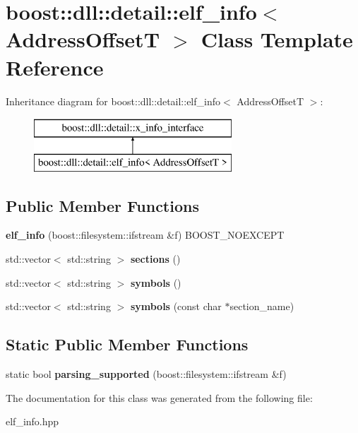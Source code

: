 \hypertarget{a01408}{}\section{boost\+:\+:dll\+:\+:detail\+:\+:elf\+\_\+info$<$ Address\+OffsetT $>$ Class Template Reference}
\label{a01408}
Inheritance diagram for boost\+:\+:dll\+:\+:detail\+:\+:elf\+\_\+info$<$ Address\+OffsetT $>$\+:\begin{figure}[H]
\begin{center}
\leavevmode
\includegraphics[height=2.000000cm]{a01408}
\end{center}
\end{figure}
\subsection*{Public Member Functions}
\begin{DoxyCompactItemize}
\item 
\mbox{\label{a01408_a86ac2d6ccd8f1690d9fa285a20a9357e}} 
{\bfseries elf\+\_\+info} (boost\+::filesystem\+::ifstream \&f) B\+O\+O\+S\+T\+\_\+\+N\+O\+E\+X\+C\+E\+PT
\item 
\mbox{\label{a01408_a14b62434f2be710f2a0a8da8fde24bca}} 
std\+::vector$<$ std\+::string $>$ {\bfseries sections} ()
\item 
\mbox{\label{a01408_a131b0f293d358d4d75ac6f63ec365285}} 
std\+::vector$<$ std\+::string $>$ {\bfseries symbols} ()
\item 
\mbox{\label{a01408_a07e28e88baa3914a205693b8921d2b87}} 
std\+::vector$<$ std\+::string $>$ {\bfseries symbols} (const char $\ast$section\+\_\+name)
\end{DoxyCompactItemize}
\subsection*{Static Public Member Functions}
\begin{DoxyCompactItemize}
\item 
\mbox{\label{a01408_a7f38916fd4bb133614d04870406d7c62}} 
static bool {\bfseries parsing\+\_\+supported} (boost\+::filesystem\+::ifstream \&f)
\end{DoxyCompactItemize}


The documentation for this class was generated from the following file\+:\begin{DoxyCompactItemize}
\item 
elf\+\_\+info.\+hpp\end{DoxyCompactItemize}
